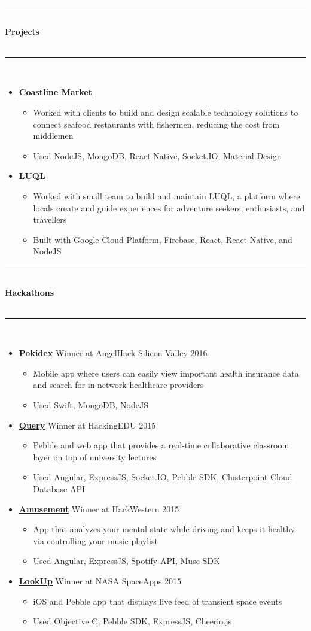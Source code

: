 \documentclass[10pt]{article}
\newcommand{\cvsectiontitle}[1]{%
	\rule{\linewidth}{0.2mm}\\%
		{\large\indent\textbf{#1}}\\%
	\\[-6.5mm]\rule{\linewidth}{0.2mm}\\[2mm]%
	}
\newcommand{\cvproject}[3]{\textbf{\href{#2}{#1}}\hspace{\stretch{3}}{#3}}
\newcommand{\cvhackathonproject}[4]{\href{#2}{\textbf{#1}} {#3} \color{BrickRed}\textit{#4} \color{Black}}
\newcommand{\cvsublevel}[1]{\begin{itemize}[leftmargin=0.5cm] #1\end{itemize}}
\newcommand{\cvsubbullet}[1]{\vspace{-1mm}\item #1}
\begin{document}
\vspace{-2.5mm}
\cvsectiontitle{Projects}
\vspace{-0.8cm}
\begin{itemize}[leftmargin=0.5cm]
\item \cvproject{Coastline Market}{https://www.coastlinemarket.com/}{}\cvsublevel{
	\cvsubbullet{Worked with clients to build and design scalable technology solutions to connect seafood restaurants with fishermen, reducing the cost from middlemen}
	\cvsubbullet{Used NodeJS, MongoDB, React Native, Socket.IO, Material Design}
}
\item \cvproject{LUQL}{https://luql.io/}{}\cvsublevel{
	\cvsubbullet{Worked with small team to build and maintain LUQL, a platform where locals create and guide experiences for adventure seekers, enthusiasts, and travellers}
	\cvsubbullet{Built with Google Cloud Platform, Firebase, React, React Native, and NodeJS}
}
\end{itemize}

\vspace{-2.5mm}
\cvsectiontitle{Hackathons}
\vspace{-0.8cm}
\begin{itemize}[leftmargin=0.5cm]
\item \cvhackathonproject{Pokidex}{http://www.hackathon.io/pokidex}{Winner at AngelHack Silicon Valley 2016}{}\cvsublevel{
	\cvsubbullet{Mobile app where users can easily view important health insurance data and search for in-network healthcare providers}
	\cvsubbullet{Used Swift, MongoDB, NodeJS}
}
\item \cvhackathonproject{Query}{http://devpost.com/software/query-sctlva}{Winner at HackingEDU 2015}{}\cvsublevel{
	\cvsubbullet{Pebble and web app that provides a real-time collaborative classroom layer on top of university lectures}
	\cvsubbullet{Used Angular, ExpressJS, Socket.IO, Pebble SDK, Clusterpoint Cloud Database API}
}
\item \cvhackathonproject{Amusement}{http://challengepost.com/software/amusement-um9im}{Winner at HackWestern 2015}{}\cvsublevel{
	\cvsubbullet{App that analyzes your mental state while driving and keeps it healthy via controlling your music playlist}
	\cvsubbullet{Used Angular, ExpressJS, Spotify API, Muse SDK}
}
\item \cvhackathonproject{LookUp}{https://twitter.com/SpaceAppsTO/status/587444439276191744}{Winner at NASA SpaceApps 2015}{}\cvsublevel{
	\cvsubbullet{iOS and Pebble app that displays live feed of transient space events}
	\cvsubbullet{Used Objective C, Pebble SDK, ExpressJS, Cheerio.js}
}
\end{itemize}
\end{document}
